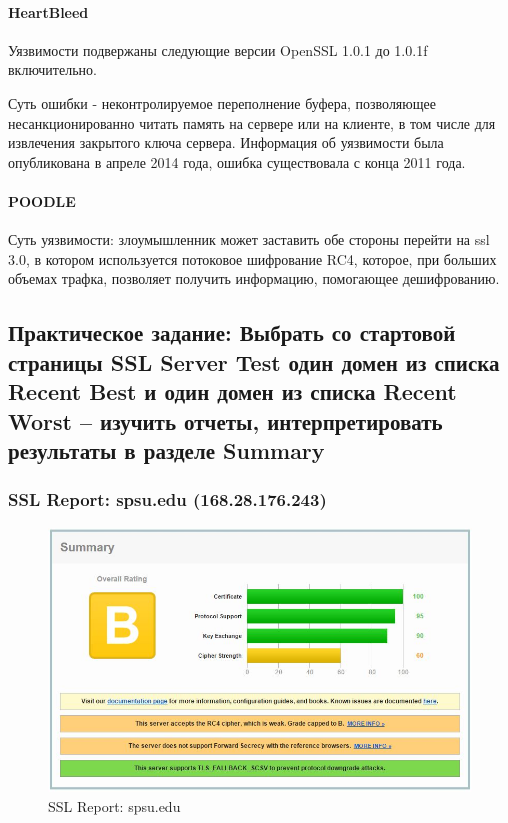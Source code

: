 \documentclass[10pt,a4paper]{article}
\begin{document}
\paragraph{HeartBleed}
Уязвимости подвержаны следующие версии
OpenSSL 1.0.1 до 1.0.1f включительно.

Суть ошибки - неконтролируемое переполнение буфера, позволяющее несанкционированно читать память на сервере или на клиенте, в том числе для извлечения закрытого ключа сервера. Информация об уязвимости была опубликована в апреле 2014 года, ошибка существовала с конца 2011 года.


\paragraph{POODLE}
Суть уязвимости: злоумышленник может заставить обе стороны перейти на ssl 3.0, в котором используется потоковое шифрование RC4, которое, при больших объемах трафка, позволяет получить информацию, помогающее дешифрованию.


\subsection{Практическое задание: Выбрать со стартовой страницы SSL Server Test один домен из списка Recent Best и один домен из списка Recent Worst – изучить отчеты, интерпретировать результаты в разделе Summary}

\subsubsection{SSL Report: spsu.edu (168.28.176.243)}

\begin{figure}[h!]
\centering
\includegraphics[scale=0.6]{1.jpg}
\caption{SSL Report: spsu.edu}
\end{figure}
\end{document}
